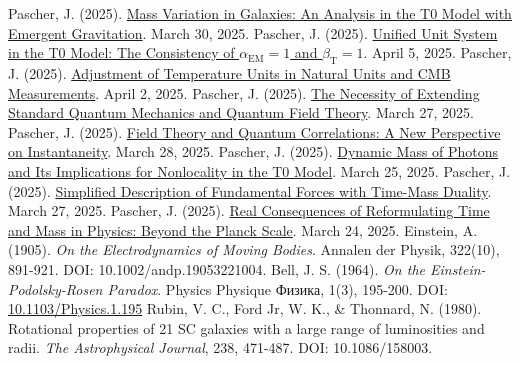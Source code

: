 \documentclass[12pt,a4paper]{article}
\newcommand{\betaT}{\beta_{\text{T}}}
\newcommand{\alphaEM}{\alpha_{\text{EM}}}
\begin{document}
\begin{thebibliography}{99}
		 Pascher, J. (2025). \href{https://github.com/jpascher/T0-Time-Mass-Duality/tree/main/2/pdf/English/MassVarGalaxienEn.pdf}{Mass Variation in Galaxies: An Analysis in the T0 Model with Emergent Gravitation}. March 30, 2025.
		 Pascher, J. (2025). \href{https://github.com/jpascher/T0-Time-Mass-Duality/tree/main/2/pdf/English/Alpha1Beta1KonsistenzEn.pdf}{Unified Unit System in the T0 Model: The Consistency of \(\alphaEM = 1\) and \(\betaT = 1\)}. April 5, 2025.
		 Pascher, J. (2025). \href{https://github.com/jpascher/T0-Time-Mass-Duality/tree/main/2/pdf/English/TempEinheitenCMBEn.pdf}{Adjustment of Temperature Units in Natural Units and CMB Measurements}. April 2, 2025.
		 Pascher, J. (2025). \href{https://github.com/jpascher/T0-Time-Mass-Duality/tree/main/2/pdf/English/NotwendigkeitQMErweiterungEn.pdf}{The Necessity of Extending Standard Quantum Mechanics and Quantum Field Theory}. March 27, 2025.
		 Pascher, J. (2025). \href{https://github.com/jpascher/T0-Time-Mass-Duality/tree/main/2/pdf/English/FeldtheorieQuantenEn.pdf}{Field Theory and Quantum Correlations: A New Perspective on Instantaneity}. March 28, 2025.
		 Pascher, J. (2025). \href{https://github.com/jpascher/T0-Time-Mass-Duality/tree/main/2/pdf/English/DynMassePhotonenNichtlokalEn.pdf}{Dynamic Mass of Photons and Its Implications for Nonlocality in the T0 Model}. March 25, 2025.
		 Pascher, J. (2025). \href{https://github.com/jpascher/T0-Time-Mass-Duality/tree/main/2/pdf/English/VierKraefteZeitMasseEn.pdf}{Simplified Description of Fundamental Forces with Time-Mass Duality}. March 27, 2025.
		 Pascher, J. (2025). \href{https://github.com/jpascher/T0-Time-Mass-Duality/tree/main/2/pdf/English/JenseitsPlanckEn.pdf}{Real Consequences of Reformulating Time and Mass in Physics: Beyond the Planck Scale}. March 24, 2025.
		 Einstein, A. (1905). \textit{On the Electrodynamics of Moving Bodies}. Annalen der Physik, 322(10), 891-921. DOI: 10.1002/andp.19053221004.
		 Bell, J. S. (1964). \textit{On the Einstein-Podolsky-Rosen Paradox}. Physics Physique {\selectfont Физика}, 1(3), 195-200. DOI: \href{https://doi.org/10.1103/Physics.1.195}{10.1103/Physics.1.195}
		 Rubin, V. C., Ford Jr, W. K., \& Thonnard, N. (1980). Rotational properties of 21 SC galaxies with a large range of luminosities and radii. \textit{The Astrophysical Journal}, 238, 471-487. DOI: 10.1086/158003.

\end{thebibliography}
\end{document}
